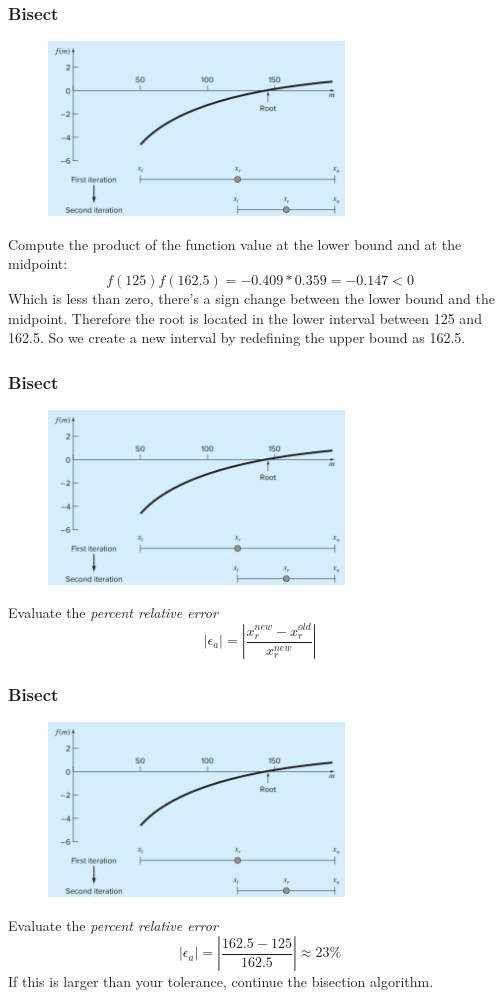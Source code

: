 \documentclass{if-beamer}
\begin{document}
\begin{frame}
\frametitle{Bisect}
\begin{figure}
	\center
	\includegraphics[width=0.7\textwidth]{figures/bracket2.png}
\end{figure}
Compute the product of the function value at the lower bound and at the midpoint:
$$f(125)f(162.5) = −0.409*0.359 = −0.147 < 0$$
Which is less than zero, there's a sign change between the lower bound and the midpoint. Therefore the root is located in the lower interval between 125 and 162.5. So we create a new interval by redefining the upper bound as 162.5.  
\end{frame}

\begin{frame}
\frametitle{Bisect}
\begin{figure}
	\center
	\includegraphics[width=0.7\textwidth]{figures/bracket2.png}
\end{figure}
Evaluate the \textit{percent relative error} 
$$ |\epsilon_a| = |\frac{x_r^{new}-x_r^{old}}{x_r^{new}}| $$
\end{frame}

\begin{frame}
\frametitle{Bisect}
\begin{figure}
\center
\includegraphics[width=0.7\textwidth]{figures/bracket2.png}
\end{figure}
Evaluate the \textit{percent relative error} 
$$ |\epsilon_a| = |\frac{162.5 - 125}{162.5}| \approx 23\% $$
If this is larger than your tolerance, continue the bisection algorithm.
\end{frame}
\end{document}
